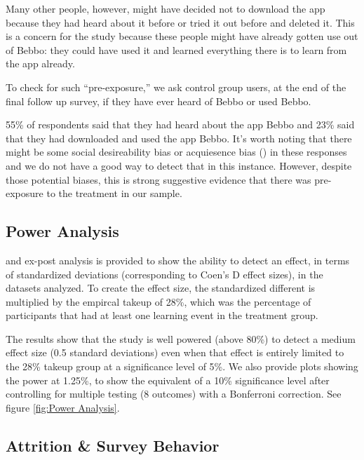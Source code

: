 \documentclass{article}
\begin{document}
Many other people, however, might have decided not to download the app because they had heard about it before or tried it out before and deleted it. This is a concern for the study because these people might have already gotten use out of Bebbo: they could have used it and learned everything there is to learn from the app already.

To check for such ``pre-exposure,'' we ask control group users, at the end of the final follow up survey, if they have ever heard of Bebbo or used Bebbo.

55\% of respondents said that they had heard about the app Bebbo and 23\% said that they had downloaded and used the app Bebbo. It's worth noting that there might be some social desireability bias or acquiesence bias (\cite{Stantcheva2023}) in these responses and we do not have a good way to detect that in this instance. However, despite those potential biases, this is strong suggestive evidence that there was pre-exposure to the treatment in our sample.



\subsection*{Power Analysis}

and ex-post analysis is provided to show the ability to detect an effect, in terms of standardized deviations (corresponding to Coen's D effect sizes), in the datasets analyzed. To create the effect size, the standardized different is multiplied by the empircal takeup of 28\%, which was the percentage of participants that had at least one learning event in the treatment group.

The results show that the study is well powered (above 80\%) to detect a medium effect size (0.5 standard deviations) even when that effect is entirely limited to the 28\% takeup group at a significance level of 5\%. We also provide plots showing the power at 1.25\%, to show the equivalent of a 10\% significance level after controlling for multiple testing (8 outcomes) with a Bonferroni correction. See figure \ref{fig:Power Analysis}.



\subsection*{Attrition \& Survey Behavior}
\end{document}
